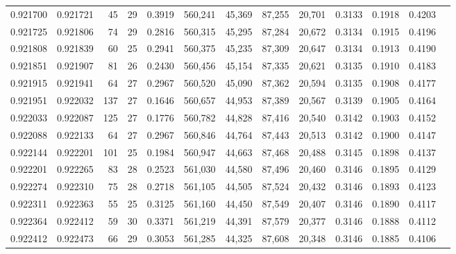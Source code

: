 \begin{tabular}{rrrrrrrrrrrrr}
0.921700 & 0.921721 &    45 &  29 &                                     0.3919 & 560,241 &  45,369 &  87,255 &  20,701 & 0.3133 & 0.1918 & 0.4203 \\
0.921725 & 0.921806 &    74 &  29 &                                     0.2816 & 560,315 &  45,295 &  87,284 &  20,672 & 0.3134 & 0.1915 & 0.4196 \\
0.921808 & 0.921839 &    60 &  25 &                                     0.2941 & 560,375 &  45,235 &  87,309 &  20,647 & 0.3134 & 0.1913 & 0.4190 \\
0.921851 & 0.921907 &    81 &  26 &                                     0.2430 & 560,456 &  45,154 &  87,335 &  20,621 & 0.3135 & 0.1910 & 0.4183 \\
0.921915 & 0.921941 &    64 &  27 &                                     0.2967 & 560,520 &  45,090 &  87,362 &  20,594 & 0.3135 & 0.1908 & 0.4177 \\
0.921951 & 0.922032 &   137 &  27 &                                     0.1646 & 560,657 &  44,953 &  87,389 &  20,567 & 0.3139 & 0.1905 & 0.4164 \\
0.922033 & 0.922087 &   125 &  27 &                                     0.1776 & 560,782 &  44,828 &  87,416 &  20,540 & 0.3142 & 0.1903 & 0.4152 \\
0.922088 & 0.922133 &    64 &  27 &                                     0.2967 & 560,846 &  44,764 &  87,443 &  20,513 & 0.3142 & 0.1900 & 0.4147 \\
0.922144 & 0.922201 &   101 &  25 &                                     0.1984 & 560,947 &  44,663 &  87,468 &  20,488 & 0.3145 & 0.1898 & 0.4137 \\
0.922201 & 0.922265 &    83 &  28 &                                     0.2523 & 561,030 &  44,580 &  87,496 &  20,460 & 0.3146 & 0.1895 & 0.4129 \\
0.922274 & 0.922310 &    75 &  28 &                                     0.2718 & 561,105 &  44,505 &  87,524 &  20,432 & 0.3146 & 0.1893 & 0.4123 \\
0.922311 & 0.922363 &    55 &  25 &                                     0.3125 & 561,160 &  44,450 &  87,549 &  20,407 & 0.3146 & 0.1890 & 0.4117 \\
0.922364 & 0.922412 &    59 &  30 &                                     0.3371 & 561,219 &  44,391 &  87,579 &  20,377 & 0.3146 & 0.1888 & 0.4112 \\
0.922412 & 0.922473 &    66 &  29 &                                     0.3053 & 561,285 &  44,325 &  87,608 &  20,348 & 0.3146 & 0.1885 & 0.4106 \\

\end{tabular}
